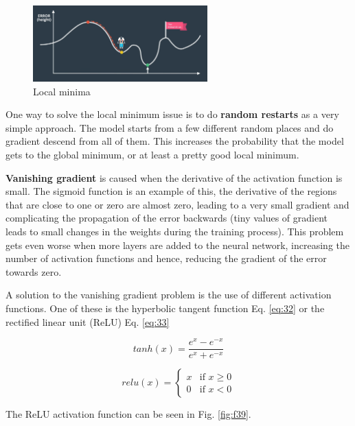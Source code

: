 \documentclass{article}
\begin{document}
\begin{figure}[ht]
    \centering
    \includegraphics[width=0.6\textwidth,height=0.6\textheight,keepaspectratio]{images/minima.png}
    \captionsetup{justification=centering}
    \caption{Local minima}
    \label{fig:f38}
\end{figure}

One way to solve the local minimum issue is to do \textbf{random restarts} as a very simple approach. The model starts from a few different random places and do gradient descend from all of them. This increases the probability that the model gets to the global minimum, or at least a pretty good local minimum.

\textbf{Vanishing gradient} is caused when the derivative of the activation function is small. The sigmoid function is an example of this, the derivative of the regions that are close to one or zero are almost zero, leading to a very small gradient and complicating the propagation of the error backwards (tiny values of gradient leads to small changes in the weights during the training process). This problem gets even worse when more layers are added to the neural network, increasing the number of activation functions and hence, reducing the gradient of the error towards zero.

A solution to the vanishing gradient problem is the use of different activation functions. One of these is the hyperbolic tangent function Eq. \eqref{eq:32} or the rectified linear unit (ReLU) Eq. \eqref{eq:33}

\begin{equation}
\label{eq:32}
tanh(x) = \frac{e^x - e^{-x}}{e^x + e^{-x}}
\end{equation}

\begin{equation}
\label{eq:33}
relu(x) = \begin{cases} 
            x & \text{if } x \geq 0  \\
            0 & \text{if } x < 0
            \end{cases}
\end{equation}

The ReLU activation function can be seen in Fig. \ref{fig:f39}.
\end{document}

